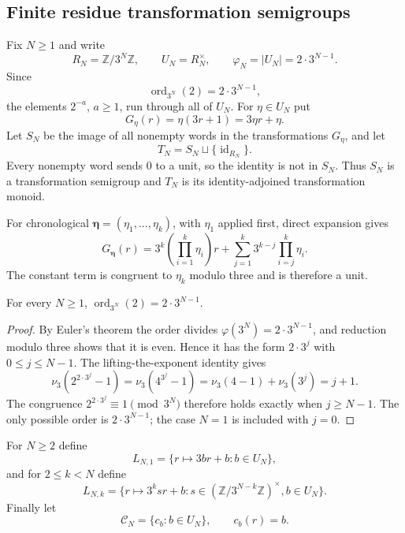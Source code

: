 \subsection{Finite residue transformation semigroups}

Fix $N\geq1$ and write
\[
 R_N=\mathbb Z/3^N\mathbb Z,
 \qquad U_N=R_N^\times,
 \qquad \varphi_N=|U_N|=2\cdot3^{N-1}.
\]
Since
\[
 \operatorname{ord}_{3^N}(2)=2\cdot3^{N-1},
\]
the elements $2^{-a}$, $a\geq1$, run through all of $U_N$.  For
$\eta\in U_N$ put
\[
 G_\eta(r)=\eta(3r+1)=3\eta r+\eta.
\]
Let $S_N$ be the image of all nonempty words in the transformations $G_\eta$,
and let
\[
 T_N=S_N\sqcup\{\operatorname{id}_{R_N}\}.
\]
Every nonempty word sends $0$ to a unit, so the identity is not in $S_N$.
Thus $S_N$ is a transformation semigroup and $T_N$ is its identity-adjoined
transformation monoid.

For chronological $\boldsymbol\eta=(\eta_1,\ldots,\eta_k)$, with $\eta_1$
applied first,
direct expansion gives
\begin{equation}
\label{eq:finite-residue-word-affine-formula}
 G_{\boldsymbol\eta}(r)
 =3^k\left(\prod_{i=1}^k \eta_i\right)r
  +\sum_{j=1}^k3^{k-j}\prod_{i=j}^k \eta_i.
\end{equation}
The constant term is congruent to $\eta_k$ modulo three and is therefore a
unit.

\begin{lemma}
\label{lem:order-two-mod-three-power}
For every $N\geq1$,
$\operatorname{ord}_{3^N}(2)=2\cdot3^{N-1}$.
\end{lemma}

\begin{proof}
By Euler's theorem the order divides
$\varphi(3^N)=2\cdot3^{N-1}$, and reduction modulo three shows that it is
even.  Hence it has the form $2\cdot3^j$ with $0\leq j\leq N-1$.  The
lifting-the-exponent
identity gives
\[
 \nu_3(2^{2\cdot3^j}-1)
 =\nu_3(4^{3^j}-1)=\nu_3(4-1)+\nu_3(3^j)=j+1.
\]
The congruence $2^{2\cdot3^j}\equiv1\pmod{3^N}$ therefore holds exactly when
$j\geq N-1$.  The only possible order is $2\cdot3^{N-1}$; the case $N=1$
is included with $j=0$.
\end{proof}

For $N\geq2$ define
\[
 L_{N,1}=\{r\mapsto3br+b:b\in U_N\},
\]
and for $2\leq k<N$ define
\[
 L_{N,k}=\{r\mapsto3^ksr+b:
          s\in(\mathbb Z/3^{N-k}\mathbb Z)^\times, b\in U_N\}.
\]
Finally let
\[
 \mathcal C_N=\{c_b:b\in U_N\},
 \qquad c_b(r)=b.
\]

